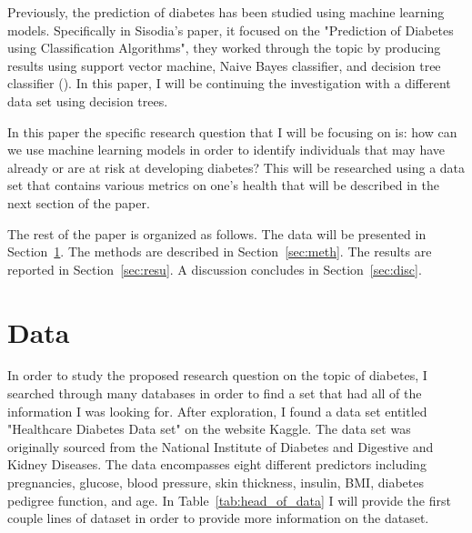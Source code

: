 \documentclass[12pt]{article}
\begin{document}
    Previously, the prediction of diabetes has been studied using machine learning models. Specifically in Sisodia's paper, it focused
    on the "Prediction of Diabetes using Classification Algorithms", they worked through the topic by producing results using support 
    vector machine, Naive Bayes classifier, and decision tree classifier (\cite{Sisodia2018Prediction}). In this paper, I will be 
    continuing the investigation with a different data set using decision trees.

    In this paper the specific research question that I will be focusing on is: how can we use machine learning models in order to identify 
    individuals that may have already or are at risk at developing diabetes? This will be researched using a data set that contains various 
    metrics on one's health that will be described in the next section of the paper.

    The rest of the paper is organized as follows.
    The data will be presented in Section~\ref{sec:data}.
    The methods are described in Section~\ref{sec:meth}.
    The results are reported in Section~\ref{sec:resu}.
    A discussion concludes in Section~\ref{sec:disc}.

\section{Data}
\label{sec:data}
    In order to study the proposed research question on the topic of diabetes, I searched through many databases in order to find a set 
    that had all of the information I was looking for. After exploration, I found a data set entitled "Healthcare Diabetes Data set" on 
    the website Kaggle. The data set was originally sourced from the National Institute of Diabetes and Digestive and Kidney Diseases. The 
    data encompasses eight different predictors including pregnancies, glucose, blood pressure, skin thickness, insulin, BMI, diabetes 
    pedigree function, and age. In Table~\ref{tab:head_of_data} I will provide the first couple lines of dataset in order to provide
    more information on the dataset.
\end{document}
